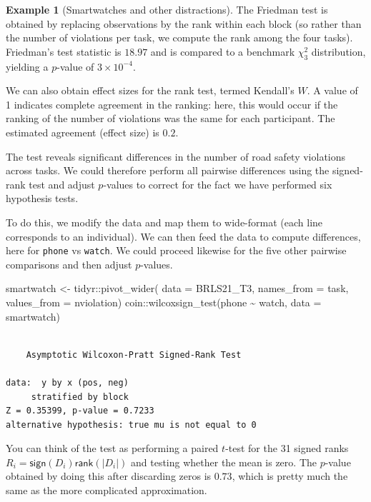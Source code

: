 \documentclass[
  11pt,
  letterpaper,
]{scrbook}
\newenvironment{Shaded}{\begin{snugshade}}{\end{snugshade}}
\newcommand{\AttributeTok}[1]{\textcolor[rgb]{0.40,0.45,0.13}{#1}}
\newcommand{\FunctionTok}[1]{\textcolor[rgb]{0.28,0.35,0.67}{#1}}
\newcommand{\NormalTok}[1]{\textcolor[rgb]{0.00,0.23,0.31}{#1}}
\newcommand{\OtherTok}[1]{\textcolor[rgb]{0.00,0.23,0.31}{#1}}
\newcommand{\SpecialCharTok}[1]{\textcolor[rgb]{0.37,0.37,0.37}{#1}}
\theoremstyle{definition}
\newtheorem{example}{Example}[chapter]
\theoremstyle{definition}
\theoremstyle{remark}
\begin{document}
\begin{example}[Smartwatches and other
distractions]
The Friedman test is obtained by replacing observations by the rank
within each block (so rather than the number of violations per task, we
compute the rank among the four tasks). Friedman's test statistic is
\(18.97\) and is compared to a benchmark \(\chi^2_3\) distribution,
yielding a \(p\)-value of \(\ensuremath{3\times 10^{-4}}.\)

We can also obtain effect sizes for the rank test, termed Kendall's
\(W.\) A value of 1 indicates complete agreement in the ranking: here,
this would occur if the ranking of the number of violations was the same
for each participant. The estimated agreement (effect size) is \(0.2.\)

The test reveals significant differences in the number of road safety
violations across tasks. We could therefore perform all pairwise
differences using the signed-rank test and adjust \(p\)-values to
correct for the fact we have performed six hypothesis tests.

To do this, we modify the data and map them to wide-format (each line
corresponds to an individual). We can then feed the data to compute
differences, here for \texttt{phone} vs \texttt{watch}. We could proceed
likewise for the five other pairwise comparisons and then adjust
\(p\)-values.

\begin{Shaded}
\begin{Highlighting}[]
\NormalTok{smartwatch }\OtherTok{\textless{}{-}}\NormalTok{ tidyr}\SpecialCharTok{::}\FunctionTok{pivot\_wider}\NormalTok{(}
  \AttributeTok{data =}\NormalTok{ BRLS21\_T3,}
  \AttributeTok{names\_from =}\NormalTok{ task,}
  \AttributeTok{values\_from =}\NormalTok{ nviolation)}
\NormalTok{coin}\SpecialCharTok{::}\FunctionTok{wilcoxsign\_test}\NormalTok{(phone }\SpecialCharTok{\textasciitilde{}}\NormalTok{ watch,}
                      \AttributeTok{data =}\NormalTok{ smartwatch)}
\end{Highlighting}
\end{Shaded}

\begin{verbatim}

    Asymptotic Wilcoxon-Pratt Signed-Rank Test

data:  y by x (pos, neg) 
     stratified by block
Z = 0.35399, p-value = 0.7233
alternative hypothesis: true mu is not equal to 0
\end{verbatim}

You can think of the test as performing a paired \(t\)-test for the 31
signed ranks \(R_i =\mathsf{sign}(D_i) \mathsf{rank}(|D_i|)\) and
testing whether the mean is zero. The \(p\)-value obtained by doing this
after discarding zeros is \(0.73\), which is pretty much the same as the
more complicated approximation.

\end{example}
\end{document}
